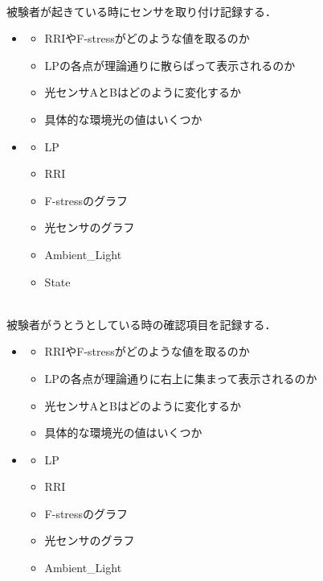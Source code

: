 \\
被験者が起きている時にセンサを取り付け記録する．
\begin{itemize}
\item {}
\begin{itemize}
\item RRIやF-stressがどのような値を取るのか
\item LPの各点が理論通りに散らばって表示されるのか
\item 光センサAとBはどのように変化するか
\item 具体的な環境光の値はいくつか
\end{itemize}
\item {}
\begin{itemize}
\item LP
\item RRI
\item F-stressのグラフ
\item 光センサのグラフ
\item Ambient\_Light
\item State
\end{itemize}
\end{itemize}

\\
被験者がうとうとしている時の確認項目を記録する．
\begin{itemize}
\item {}
\begin{itemize}
\item RRIやF-stressがどのような値を取るのか
\item LPの各点が理論通りに右上に集まって表示されるのか
\item 光センサAとBはどのように変化するか
\item 具体的な環境光の値はいくつか
\end{itemize}
\item {}
\begin{itemize}
\item LP
\item RRI
\item F-stressのグラフ
\item 光センサのグラフ
\item Ambient\_Light
\end{itemize}
\end{itemize}

